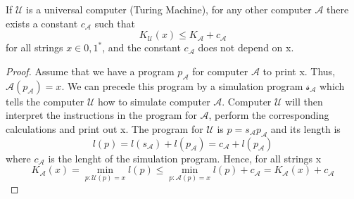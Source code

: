     \begin{theorem}
        If $\mathcal{U}$ is a universal computer (Turing Machine), for any other computer $\mathcal{A}$ there exists a constant $c_\mathcal{A}$ such that \[ 
            K_\mathcal{U}(x) \leq K_\mathcal{A} + c_\mathcal{A} 
        \]
        for all strings $x \in {0,1}^*$, and the constant $c_\mathcal{A}$ does not depend on x.
        \begin{proof}
            Assume that we have a program $p_\mathcal{A}$ for computer $\mathcal{A}$ to print x. Thus, $\mathcal{A}(p_\mathcal{A}) = x$. We can precede this program by a simulation program $\mathcal{s_A}$ which tells the computer $\mathcal{U}$ how to simulate computer $\mathcal{A}$. Computer $\mathcal{U}$ will then interpret the instructions in the program for $\mathcal{A}$, perform the corresponding calculations and print out x. The program for $\mathcal{U}$ is $p = s_\mathcal{A}p_\mathcal{A}$ and its length is
            \[ 
                l(p) = l(s_\mathcal{A}) + l(p_\mathcal{A}) = c_\mathcal{A}+l(p_\mathcal{A})
            \]
            where $c_\mathcal{A}$ is the lenght of the simulation program. Hence, for all strings x
            \[ 
                K_\mathcal{A}(x) = \min_{p:\mathcal{U}(p)=x}{l(p)} \leq \min_{p:\mathcal{A}(p)=x}{l(p)+c_\mathcal{A}} = K_\mathcal{A}(x) +c_\mathcal{A}
            \]
        \end{proof}
    \end{theorem}
    

